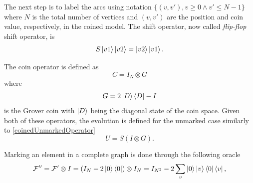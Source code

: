 \documentclass[../../dissertation.tex]{subfiles}
\begin{document}
%                
The next step is to label the arcs using notation $\{(v,v'), v \geqslant 0 \land v' \leqslant N-1\}$ 
where $N$ is the total number of vertices and $(v,v')$ are the position and coin value, respectively, in the coined model. 
The shift operator, now called \textit{flip-flop} shift operator, is
\begin{equation}
	S\ket{v1}\ket{v2} = \ket{v2}\ket{v1}.
\end{equation}\par
The coin operator is defined as
\begin{equation}
	C = I_N \otimes G
\end{equation}
where 
\begin{equation}
	G = 2\ket{D}\bra{D} - I
\end{equation}
is the Grover coin with $\ket{D}$ being the diagonal state of the coin space. Given both of these operators, the evolution is defined for the unmarked case similarly to \ref{coinedUnmarkedOperator}
\begin{equation}
	U = S(I \otimes G).
\end{equation}\par
Marking an element in a complete graph is done through the following oracle
\begin{equation}
	\mathcal{F''} =\mathcal{F'}\otimes I = (I_N - 2\ket{0}\bra{0})\otimes I_N = I_{N^2} - 2 \sum_v \ket{0}\ket{v}\bra{0}\bra{v} ,
\end{equation}
\end{document}
